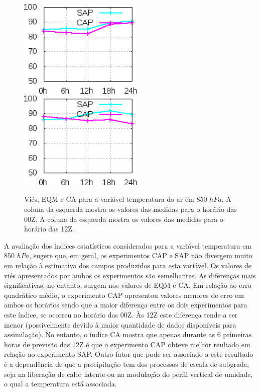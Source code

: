\begin{figure}[!hbp]
\includegraphics[height=4.7cm]{./figs/CA850temp0Z.png}\hspace{1.0cm}\includegraphics[height=4.7cm]{./figs/CA850temp12Z.png}
\caption{Viés, EQM e CA para a variável temperatura do ar em 850 $hPa$. A coluna da esquerda mostra os valores das medidas para o horário das 00Z. A coluna da esquerda mostra os valores das medidas para o horário das 12Z.}
\label{fig55}
\end{figure}

A avaliação dos índices estatísticos considerados para a variável temperatura em 850 $hPa$, sugere que, em geral, os experimentos CAP e SAP não divergem muito em relação à estimativa dos campos produzidos para esta variável. Os valores de viés apresentados por ambos os experimentos são semelhantes. As diferenças mais significativas, no entanto, surgem nos valores de EQM e CA. Em relação ao erro quadrático médio, o experimento CAP apresentou valores menores de erro em ambos os horários sendo que a maior diferença entre os dois experimentos para este índice, se ocorreu no horário das 00Z. Às 12Z este diferença tende a ser menor (possivelmente devido à maior quantidade de dados disponíveis para assimilação). No entanto, o índice CA mostra que apenas durante as 6 primeiras horas de previsão das 12Z é que o experimento CAP obteve melhor reultado em relação ao experimento SAP. Outro fator que pode ser associado a este resultado é a dependência de que a precipitação tem dos processos de escala de subgrade, seja na liberação de calor latente ou na modulação do perfil vertical de umidade, o qual a temperatura está associada.

